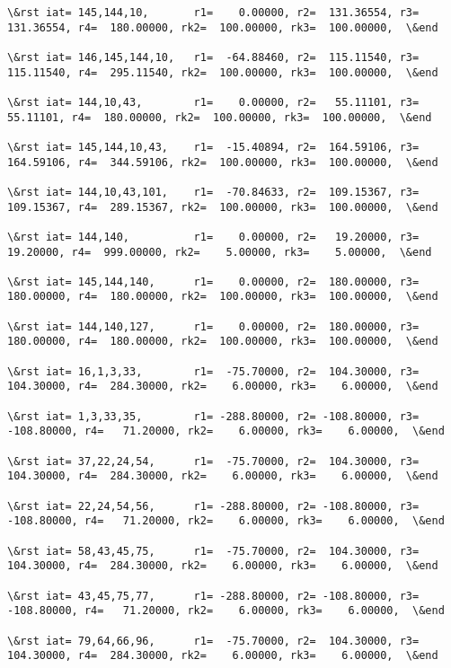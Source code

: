 \documentclass[11pt]{article}
\begin{document}
\begin{Verbatim}[commandchars=\\\{\}]
\&rst iat= 145,144,10,       r1=    0.00000, r2=  131.36554, r3=  131.36554, r4=  180.00000, rk2=  100.00000, rk3=  100.00000,  \&end

\&rst iat= 146,145,144,10,   r1=  -64.88460, r2=  115.11540, r3=  115.11540, r4=  295.11540, rk2=  100.00000, rk3=  100.00000,  \&end

\&rst iat= 144,10,43,        r1=    0.00000, r2=   55.11101, r3=   55.11101, r4=  180.00000, rk2=  100.00000, rk3=  100.00000,  \&end

\&rst iat= 145,144,10,43,    r1=  -15.40894, r2=  164.59106, r3=  164.59106, r4=  344.59106, rk2=  100.00000, rk3=  100.00000,  \&end

\&rst iat= 144,10,43,101,    r1=  -70.84633, r2=  109.15367, r3=  109.15367, r4=  289.15367, rk2=  100.00000, rk3=  100.00000,  \&end

\&rst iat= 144,140,          r1=    0.00000, r2=   19.20000, r3=   19.20000, r4=  999.00000, rk2=    5.00000, rk3=    5.00000,  \&end

\&rst iat= 145,144,140,      r1=    0.00000, r2=  180.00000, r3=  180.00000, r4=  180.00000, rk2=  100.00000, rk3=  100.00000,  \&end

\&rst iat= 144,140,127,      r1=    0.00000, r2=  180.00000, r3=  180.00000, r4=  180.00000, rk2=  100.00000, rk3=  100.00000,  \&end

\&rst iat= 16,1,3,33,        r1=  -75.70000, r2=  104.30000, r3=  104.30000, r4=  284.30000, rk2=    6.00000, rk3=    6.00000,  \&end

\&rst iat= 1,3,33,35,        r1= -288.80000, r2= -108.80000, r3= -108.80000, r4=   71.20000, rk2=    6.00000, rk3=    6.00000,  \&end

\&rst iat= 37,22,24,54,      r1=  -75.70000, r2=  104.30000, r3=  104.30000, r4=  284.30000, rk2=    6.00000, rk3=    6.00000,  \&end

\&rst iat= 22,24,54,56,      r1= -288.80000, r2= -108.80000, r3= -108.80000, r4=   71.20000, rk2=    6.00000, rk3=    6.00000,  \&end

\&rst iat= 58,43,45,75,      r1=  -75.70000, r2=  104.30000, r3=  104.30000, r4=  284.30000, rk2=    6.00000, rk3=    6.00000,  \&end

\&rst iat= 43,45,75,77,      r1= -288.80000, r2= -108.80000, r3= -108.80000, r4=   71.20000, rk2=    6.00000, rk3=    6.00000,  \&end

\&rst iat= 79,64,66,96,      r1=  -75.70000, r2=  104.30000, r3=  104.30000, r4=  284.30000, rk2=    6.00000, rk3=    6.00000,  \&end


\end{Verbatim}
\end{document}
